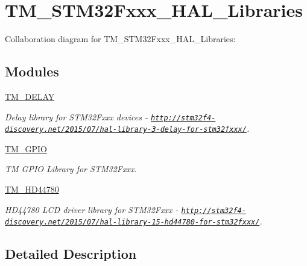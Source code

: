 \hypertarget{group___t_m___s_t_m32_fxxx___h_a_l___libraries}{}\section{T\+M\+\_\+\+S\+T\+M32\+Fxxx\+\_\+\+H\+A\+L\+\_\+\+Libraries}
\label{group___t_m___s_t_m32_fxxx___h_a_l___libraries}
Collaboration diagram for T\+M\+\_\+\+S\+T\+M32\+Fxxx\+\_\+\+H\+A\+L\+\_\+\+Libraries\+:
\subsection*{Modules}
\begin{DoxyCompactItemize}
\item 
\hyperlink{group___t_m___d_e_l_a_y}{T\+M\+\_\+\+D\+E\+L\+AY}
\begin{DoxyCompactList}\small\item\em Delay library for S\+T\+M32\+Fxxx devices -\/ \href{http://stm32f4-discovery.net/2015/07/hal-library-3-delay-for-stm32fxxx/}{\tt http\+://stm32f4-\/discovery.\+net/2015/07/hal-\/library-\/3-\/delay-\/for-\/stm32fxxx/}. \end{DoxyCompactList}\item 
\hyperlink{group___t_m___g_p_i_o}{T\+M\+\_\+\+G\+P\+IO}
\begin{DoxyCompactList}\small\item\em TM G\+P\+IO Library for S\+T\+M32\+Fxxx. \end{DoxyCompactList}\item 
\hyperlink{group___t_m___h_d44780}{T\+M\+\_\+\+H\+D44780}
\begin{DoxyCompactList}\small\item\em H\+D44780 L\+CD driver library for S\+T\+M32\+Fxxx -\/ \href{http://stm32f4-discovery.net/2015/07/hal-library-15-hd44780-for-stm32fxxx/}{\tt http\+://stm32f4-\/discovery.\+net/2015/07/hal-\/library-\/15-\/hd44780-\/for-\/stm32fxxx/}. \end{DoxyCompactList}\end{DoxyCompactItemize}


\subsection{Detailed Description}
